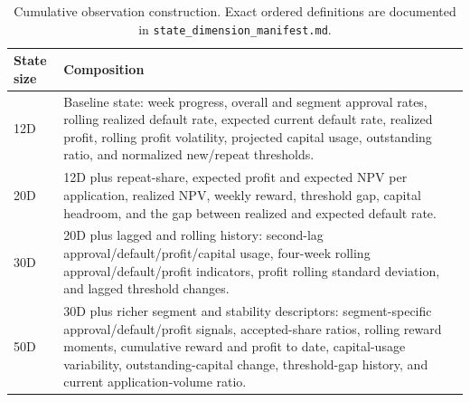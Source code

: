 \documentclass[12pt,a4paper]{article}
\begin{document}
\begin{table}[H]
    \centering
    \small
    \begin{tabularx}{0.98\textwidth}{p{}X}
        \toprule
        State size & Composition                                                                                                                                                                                                                                                                                                   \\
        \midrule
        12D        & Baseline state: week progress, overall and segment approval rates, rolling realized default rate, expected current default rate, realized profit, rolling profit volatility, projected capital usage, outstanding ratio, and normalized new/repeat thresholds.                                                \\
        20D        & 12D plus repeat-share, expected profit and expected NPV per application, realized NPV, weekly reward, threshold gap, capital headroom, and the gap between realized and expected default rate.                                                                                                                \\
        30D        & 20D plus lagged and rolling history: second-lag approval/default/profit/capital usage, four-week rolling approval/default/profit indicators, profit rolling standard deviation, and lagged threshold changes.                                                                                                 \\
        50D        & 30D plus richer segment and stability descriptors: segment-specific approval/default/profit signals, accepted-share ratios, rolling reward moments, cumulative reward and profit to date, capital-usage variability, outstanding-capital change, threshold-gap history, and current application-volume ratio. \\
        \bottomrule
    \end{tabularx}
    \caption{Cumulative observation construction. Exact ordered definitions are documented in \texttt{state\_dimension\_manifest.md}.}
    \label{tab:en-features}
\end{table}
\end{document}
